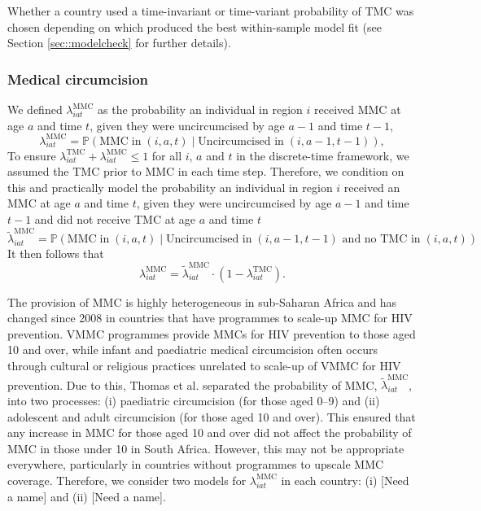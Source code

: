\documentclass{article}
\begin{document}
\begin{appendix}
Whether a country used a time-invariant or time-variant probability of TMC was chosen depending on which produced the best within-sample model fit (see Section \ref{sec::modelcheck} for further details). 


\subsubsection*{Medical circumcision}


\noindent We defined $\lambda^{\text{MMC}}_{iat}$ as the probability an individual in region $i$ received MMC at age $a$ and time $t$, given they were uncircumcised by age $a-1$ and time $t-1$,  
\begin{equation*}
		\lambda^{\text{MMC}}_{iat} = \mathbb{P}(\text{MMC} \; \text{in} \; (i,a,t) \; | \; \text{Uncircumcised in} \; (i,a-1, t-1)),
\end{equation*}
To ensure $\lambda^{\text{TMC}}_{iat} + \lambda^{\text{MMC}}_{iat} \leq 1$ for all $i$, $a$ and $t$ in the discrete-time framework, we assumed the TMC prior to MMC in each time step. Therefore, we condition on this and practically model the probability an individual in region $i$ received an MMC at age $a$ and time $t$, given they were uncircumcised by age $a-1$ and time $t-1$ and did not receive TMC at age $a$ and time $t$
\begin{equation*}
		\tilde{\lambda}^{\text{MMC}}_{iat} = \mathbb{P}(\text{MMC} \; \text{in} \; (i,a,t) \; | \; \text{Uncircumcised in} \; (i,a-1, t-1) \text{ and no TMC in} \; (i,a, t))
\end{equation*}
It then follows that 
\begin{equation*}
		\lambda^{\text{MMC}}_{iat} = \tilde{\lambda}^{\text{MMC}}_{iat}\cdot (1-\lambda^{\text{TMC}}_{iat}).
\end{equation*}

The provision of MMC is highly heterogeneous in sub-Saharan Africa and has changed  since 2008 in countries that have programmes to scale-up MMC for HIV prevention. VMMC programmes provide MMCs for HIV prevention to those aged 10 and over, while infant and paediatric medical circumcision often occurs through cultural or religious practices unrelated to scale-up of VMMC for HIV prevention. Due to this, Thomas et al. \cite{thomas2021multilevel} separated the probability of MMC, $\tilde{\lambda}^{\text{MMC}}_{iat}$, into two processes: (i) paediatric circumcision (for those aged 0--9) and (ii) adolescent and adult circumcision (for those aged 10 and over). This ensured that any increase in MMC for those aged 10 and over did not affect the probability of MMC in those under 10 in South Africa. However, this may not be appropriate everywhere, particularly in countries without programmes to upscale MMC coverage. Therefore, we consider two models for $\lambda^{\text{MMC}}_{iat}$ in each country: (i) [Need a name] and (ii) [Need a name].


\end{appendix}
\end{document}
